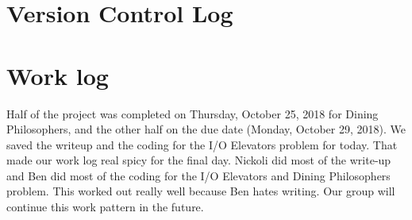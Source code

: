 \documentclass[10pt,a4paper,article]{article}
\begin{document}
\section{Version Control Log}



\section{Work log}


Half of the project was completed on Thursday, October 25, 2018 for Dining Philosophers, and the other half on the due date (Monday, October 29, 2018). We saved the writeup and the coding for the I/O Elevators problem for today. That made our work log real spicy for the final day. Nickoli did most of the write-up and Ben did most of the coding for the I/O Elevators and Dining Philosophers problem. This worked out really well because Ben hates writing. Our group will continue this work pattern in the future. 
\end{document}
